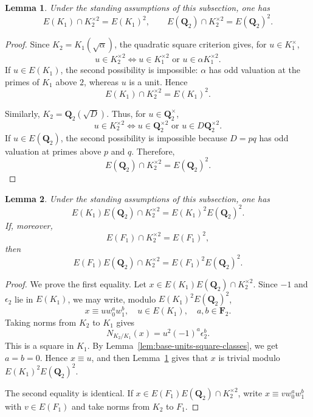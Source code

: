 \documentclass{article}
\numberwithin{equation}{section}
\theoremstyle{plain}  %
\newtheorem{lemma}{Lemma}[section]
\theoremstyle{definition}
\begin{document}
\begin{lemma}\label{lem:no-new-single-field-squares}
Under the standing assumptions of this subsection, one has
$$
E(K_1)\cap K_2^{\times 2}=E(K_1)^2,
\qquad
E(\mathbf Q_2)\cap K_2^{\times 2}=E(\mathbf Q_2)^2.
$$
\end{lemma}

\begin{proof}
Since $K_2=K_1(\sqrt \alpha)$, the quadratic square criterion gives, for $u \in K_1^\times$,
$$
u \in K_2^{\times 2} \iff u \in K_1^{\times 2} \text{ or } u \in \alpha K_1^{\times 2}.
$$
If $u \in E(K_1)$, the second possibility is impossible: $\alpha$ has odd valuation at the primes of $K_1$ above $2$, whereas $u$ is a unit. Hence
$$
E(K_1) \cap K_2^{\times 2}=E(K_1)^2.
$$

Similarly, $K_2=\mathbf Q_2(\sqrt D)$. Thus, for $u \in \mathbf Q_2^\times$,
$$
u \in K_2^{\times 2} \iff u \in \mathbf Q_2^{\times 2} \text{ or } u \in D\mathbf Q_2^{\times 2}.
$$
If $u \in E(\mathbf Q_2)$, the second possibility is impossible because $D=pq$ has odd valuation at primes above $p$ and $q$. Therefore,
$$
E(\mathbf Q_2) \cap K_2^{\times 2}=E(\mathbf Q_2)^2.
$$
\end{proof}

\begin{lemma}\label{lem:no-new-Q2-mixed-squares}
Under the standing assumptions of this subsection, one has
$$
E(K_1)E(\mathbf Q_2)\cap K_2^{\times 2}
=
E(K_1)^2E(\mathbf Q_2)^2.
$$
If, moreover,
$$
E(F_1)\cap K_2^{\times 2}=E(F_1)^2,
$$
then
$$
E(F_1)E(\mathbf Q_2)\cap K_2^{\times 2}
=
E(F_1)^2E(\mathbf Q_2)^2.
$$
\end{lemma}

\begin{proof}
We prove the first equality. Let $x \in E(K_1)E(\mathbf Q_2) \cap K_2^{\times 2}$. Since $-1$ and $\epsilon_2$ lie in $E(K_1)$, we may write, modulo $E(K_1)^2E(\mathbf Q_2)^2$,
$$
x \equiv u w_0^a w_1^b, \quad u \in E(K_1), \quad a,b \in \mathbf F_2.
$$
Taking norms from $K_2$ to $K_1$ gives
$$
N_{K_2/K_1}(x)=u^2(-1)^a\epsilon_2^b.
$$
This is a square in $K_1$. By Lemma~\ref{lem:base-units-square-classes}, we get $a=b=0$. Hence $x \equiv u$, and then Lemma~\ref{lem:no-new-single-field-squares} gives that $x$ is trivial modulo $E(K_1)^2E(\mathbf Q_2)^2$.

The second equality is identical. If $x \in E(F_1)E(\mathbf Q_2) \cap K_2^{\times 2}$, write $x \equiv v w_0^a w_1^b$ with $v \in E(F_1)$ and take norms from $K_2$ to $F_1$.
\end{proof}
\end{document}
